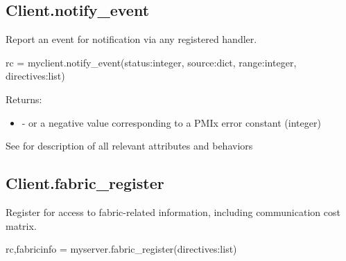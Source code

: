 \subsection{Client.notify_event}

\summary

Report an event for notification via any registered handler.

\format

\pyspecificstart
\begin{codepar}
rc = myclient.notify_event(status:integer, source:dict,
                           range:integer, directives:list)
\end{codepar}
\pyspecificend

\begin{arglist}
\end{arglist}

Returns:
\begin{itemize}
    \item {} -  or a negative value corresponding to a PMIx error constant (integer)
\end{itemize}

See  for description of all relevant attributes and behaviors


\subsection{Client.fabric_register}

\summary
Register for access to fabric-related information, including communication cost matrix.

\format

\pyspecificstart
\begin{codepar}
rc,fabricinfo = myserver.fabric_register(directives:list)
\end{codepar}
\pyspecificend


\begin{arglist}
\end{arglist}

